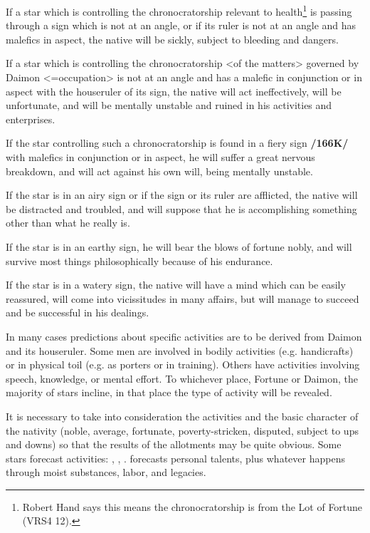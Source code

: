 If a star which is controlling the chronocratorship relevant to health\footnote{Robert Hand says this means the chronocratorship is from the Lot of Fortune (VRS4 12).} is passing through a sign which is not at an angle, or if its ruler is not at an angle and has malefics in aspect, the native will be sickly, subject to bleeding and dangers. 

If a star which is controlling the chronocratorship <of the matters> governed by Daimon <=occupation> is not at an angle and has a malefic in conjunction or in aspect with the houseruler of its sign, the native will act ineffectively, will be unfortunate, and will be mentally unstable and ruined in
his activities and enterprises. 

If the star controlling such a chronocratorship is found in a fiery sign \textbf{/166K/} with malefics in conjunction or in aspect, he will suffer a great nervous breakdown, and will act against his own will, being mentally unstable. 

If the star is in an airy sign or if the sign or its ruler are afflicted, the native will be distracted and troubled, and will suppose that he is accomplishing something other than what he really is. 

If the star is in an earthy sign, he will bear the blows of fortune nobly, and will survive most things philosophically because of his endurance. 

If the star is in a watery sign, the native will have a mind which can be easily reassured, will come into vicissitudes in many affairs, but will manage to succeed and be successful in his dealings.

In many cases predictions about specific activities are to be derived from Daimon and its houseruler. Some men are involved in bodily activities (e.g. handicrafts) or in physical toil (e.g. as porters or in training). Others have activities involving speech, knowledge, or mental effort. To whichever place, Fortune or Daimon, the majority of stars incline, in that place the type of activity will be revealed. 

It is necessary to take into consideration the activities and the basic character of the nativity (noble, average, fortunate, poverty-stricken, disputed, subject to ups and downs) so that the results of the allotments may be quite obvious. Some stars forecast activities: \Mars, \Venus, \Mercury. \Saturn\xspace forecasts personal talents, plus whatever happens through moist substances, labor, and legacies. 

